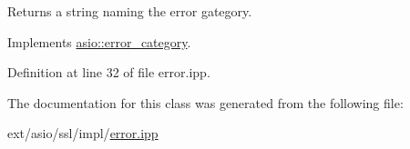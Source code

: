 Returns a string naming the error gategory. 



Implements \hyperlink{classasio_1_1error__category_a556b6099e1cc2d1cfb22e4ef2c9b0947}{asio\+::error\+\_\+category}.



Definition at line 32 of file error.\+ipp.



The documentation for this class was generated from the following file\+:\begin{DoxyCompactItemize}
\item 
ext/asio/ssl/impl/\hyperlink{ssl_2impl_2error_8ipp}{error.\+ipp}\end{DoxyCompactItemize}
